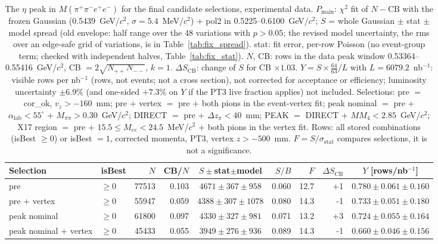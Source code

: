 \begin{table}[H]
\centering\footnotesize
\setlength{\tabcolsep}{3pt}
\caption{The $\eta$ peak in $M(\pi^+\pi^-e^+e^-)$ for the final candidate selections, experimental data. $P_\mathrm{main}$: $\chi^2$ fit of $N-\mathrm{CB}$ with the frozen Gaussian (0.5439~GeV/$c^2$, $\sigma=5.4$~MeV/$c^2$) + pol2 in 0.5225--0.6100~GeV/$c^2$; $S$ = whole Gaussian $\pm$ stat $\pm$ model spread (old envelope: half range over the 48 variations with $p>0.05$; the revised model uncertainty, the rms over an edge-safe grid of variations, is in Table~\ref{tab:fix_spread}). stat: fit error, per-row Poisson (no event-group term; checked with independent halves, Table~\ref{tab:fix_stat}). $N$, CB: rows in the data peak window 0.53364--0.55416~GeV/$c^2$, CB $=2\sqrt{N_{++}N_{--}}$, $k=1$. $\Delta S_\mathrm{CB}$: change of $S$ for CB $\times 1.03$. $Y=S\times\frac{64}{63}/L$ with $L=6079.2$~nb$^{-1}$: visible rows per nb$^{-1}$ (rows, not events; not a cross section), not corrected for acceptance or efficiency; luminosity uncertainty $\pm6.9$\% (and one-sided $+7.3$\% on $Y$ if the PT3 live fraction applies) not included. Selections: pre $=$ cor\_ok, $v_z>-160$~mm; pre + vertex $=$ pre + both pions in the event-vertex fit; peak nominal $=$ pre + $\alpha_\mathrm{lab}<55^\circ$ + $M_{\pi\pi}>0.30$~GeV/$c^2$; DIRECT $=$ pre + $\Delta z_\pi<40$~mm; PEAK $=$ DIRECT + $MM_4<2.85$~GeV/$c^2$; X17 region $=$ pre + $15.5\leq M_{ee}<24.5$~MeV/$c^2$ + both pions in the vertex fit. Rows: all stored combinations (isBest $\geq0$) or isBest $=1$, corrected momenta, PT3, vertex $z>-500$~mm. $F=S/\sigma_\mathrm{stat}$ compares selections, it is not a significance.}
\label{tab:res_peak}
\begin{tabular}{llrrcrrrc}
\toprule
Selection & isBest & $N$ & CB/$N$ & $S\pm$stat$\pm$model & $S/B$ & $F$ & $\Delta S_\mathrm{CB}$ & $Y$ [rows/nb$^{-1}$] \\
\midrule
pre & $\geq0$ & 77513 & 0.103 & $4671\pm367\pm958$ & 0.060 & 12.7 & +1 & $0.780\pm0.061\pm0.160$ \\
pre + vertex & $\geq0$ & 55947 & 0.059 & $4388\pm307\pm1078$ & 0.080 & 14.3 & -1 & $0.733\pm0.051\pm0.180$ \\
peak nominal & $\geq0$ & 61800 & 0.097 & $4330\pm327\pm981$ & 0.071 & 13.2 & +3 & $0.724\pm0.055\pm0.164$ \\
peak nominal + vertex & $\geq0$ & 45433 & 0.055 & $3949\pm276\pm936$ & 0.089 & 14.3 & -1 & $0.660\pm0.046\pm0.156$ \\

\end{tabular}
\end{table}
